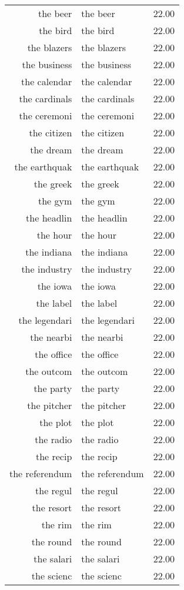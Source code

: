\begin{table}[ht]
\begin{tabular}{rlr}
  the beer & the beer & 22.00 \\ 
  the bird & the bird & 22.00 \\ 
  the blazers & the blazers & 22.00 \\ 
  the business & the business & 22.00 \\ 
  the calendar & the calendar & 22.00 \\ 
  the cardinals & the cardinals & 22.00 \\ 
  the ceremoni & the ceremoni & 22.00 \\ 
  the citizen & the citizen & 22.00 \\ 
  the dream & the dream & 22.00 \\ 
  the earthquak & the earthquak & 22.00 \\ 
  the greek & the greek & 22.00 \\ 
  the gym & the gym & 22.00 \\ 
  the headlin & the headlin & 22.00 \\ 
  the hour & the hour & 22.00 \\ 
  the indiana & the indiana & 22.00 \\ 
  the industry & the industry & 22.00 \\ 
  the iowa & the iowa & 22.00 \\ 
  the label & the label & 22.00 \\ 
  the legendari & the legendari & 22.00 \\ 
  the nearbi & the nearbi & 22.00 \\ 
  the office & the office & 22.00 \\ 
  the outcom & the outcom & 22.00 \\ 
  the party & the party & 22.00 \\ 
  the pitcher & the pitcher & 22.00 \\ 
  the plot & the plot & 22.00 \\ 
  the radio & the radio & 22.00 \\ 
  the recip & the recip & 22.00 \\ 
  the referendum & the referendum & 22.00 \\ 
  the regul & the regul & 22.00 \\ 
  the resort & the resort & 22.00 \\ 
  the rim & the rim & 22.00 \\ 
  the round & the round & 22.00 \\ 
  the salari & the salari & 22.00 \\ 
  the scienc & the scienc & 22.00 \\ 

\end{tabular}
\end{table}
